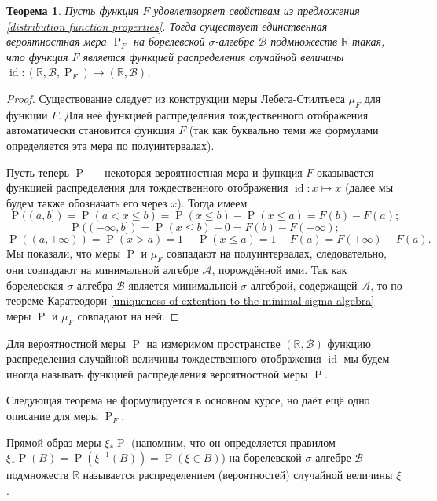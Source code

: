 \documentclass[12pt]{article}
\newtheorem{theorem}{Теорема}
\numberwithin{theorem}{section}
\theoremstyle{definition}
\newcommand{\RR}{\mathbb{R}}
\newcommand{\calA}{\mathcal{A}}
\newcommand{\calB}{\mathcal{B}}
\newcommand{\id}{\operatorname{id}}
\newcommand{\prob}{\operatorname{P}}
\newcommand{\defin}[2]{\hypertarget{#2}{{\color{red} #1}}}
\begin{document}
	\begin{theorem}
		Пусть функция $ F $ удовлетворяет свойствам из предложения \ref{distribution function properties}.
 		Тогда существует единственная вероятностная мера $ \prob_F $ на борелевской $ \sigma $-алгебре $ \calB $
 		подмножеств $ \RR $ такая, что функция $ F $ является функцией распределения случайной величины
 		$ \id \colon (\RR, \calB, \prob_F) \to (\RR, \calB) $.
	\end{theorem}
	
	\begin{proof}
		Существование следует из конструкции меры Лебега-Стилтьеса $ \mu_F $ для функции $ F $.
		Для неё функцией распределения тождественного отображения автоматически становится функция $ F $
		(так как буквально теми же формулами определяется эта мера по полуинтервалах).
		
		Пусть теперь $ \prob $ --- некоторая вероятностная мера 
		и функция $ F $ оказывается функцией распределения для тождественного отображения $ \id \colon x \mapsto x $
		(далее мы будем также обозначать его через $ x $).
		Тогда имеем
		$$ \prob((a, b]) = \prob(a < x \leqslant b) = \prob(x \leqslant b) - \prob(x \leqslant a) = F(b) - F(a); $$
		$$ \prob((-\infty, b]) = \prob(x \leqslant b) - 0 = F(b) - F(-\infty); $$
		$$ \prob((a, +\infty)) = \prob(x > a) = 1 - \prob(x \leqslant a) = 1 -  F(a) = F(+\infty) - F(a). $$
		Мы показали, что меры $ \prob $ и $ \mu_F $ совпадают на полуинтервалах,
		следовательно, они совпадают на минимальной алгебре $ \calA $, порождённой ими.
		Так как борелевская $ \sigma $-алгебра $ \calB $ является минимальной $ \sigma $-алгеброй, содержащей $ \calA $,
		то по теореме Каратеодори \ref{uniqueness of extention to the minimal sigma algebra}
		меры $ \prob $ и $ \mu_F $ совпадают на ней.
	\end{proof}
	
	Для вероятностной меры $ \prob $ на измеримом пространстве $ (\RR, \calB) $ функцию распределения случайной величины
	тождественного отображения $ \id $ мы будем иногда называть 
	\defin{функцией распределения вероятностной меры $ \prob $}{distribution-function-of-measure}.
	
	Следующая теорема не формулируется в основном курсе, но даёт ещё одно описание для меры $ \prob_F $. 
	
	Прямой образ меры $ \xi_*\prob $ (напомним, что он определяется правилом $ \xi_*\prob(B) = \prob(\xi^{-1}(B)) = \prob(\xi \in B) $) 
	на борелевской $ \sigma $-алгебре $ \calB $ подмножеств $ \RR $
	называется \defin{распределением (вероятностей) случайной величины $ \xi $}{distribution}.
	
\end{document}
